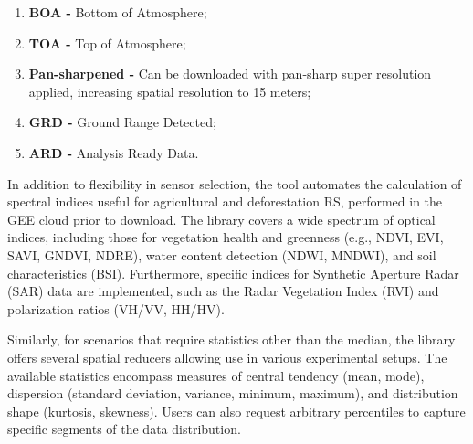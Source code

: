 \begin{landscape}
{\begin{enumerate}
  \item \textbf{BOA -} Bottom of Atmosphere;
  \item \textbf{TOA -} Top of Atmosphere;
  \item \textbf{Pan-sharpened -} Can be downloaded with pan-sharp super resolution applied, increasing spatial resolution to 15 meters;
  \item \textbf{GRD -} Ground Range Detected;
  \item \textbf{ARD -} Analysis Ready Data.
\end{enumerate}
}
\end{landscape}


In addition to flexibility in sensor selection, the tool automates the calculation of spectral indices useful for agricultural and deforestation \ac{RS}, performed in the \ac{GEE} cloud prior to download. The library covers a wide spectrum of optical indices, including those for vegetation health and greenness (e.g., NDVI, EVI, SAVI, GNDVI, NDRE), water content detection (NDWI, MNDWI), and soil characteristics (BSI). Furthermore, specific indices for Synthetic Aperture Radar (SAR) data are implemented, such as the Radar Vegetation Index (RVI) and polarization ratios (VH/VV, HH/HV).

Similarly, for scenarios that require statistics other than the median, the library offers several spatial reducers allowing use in various experimental setups. The available statistics encompass measures of central tendency (mean, mode), dispersion (standard deviation, variance, minimum, maximum), and distribution shape (kurtosis, skewness). Users can also request arbitrary percentiles to capture specific segments of the data distribution.